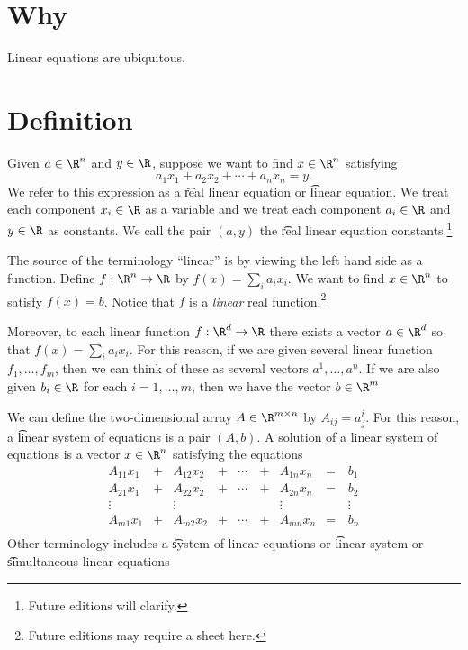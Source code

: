 
\section*{Why}

Linear equations are ubiquitous.

\section*{Definition}

Given $a \in \R ^n$ and $y \in \R $, suppose we want to find $x \in \R ^n$ satisfying
\[
a_1x_1 + a_2x_2 + \cdots + a_nx_n = y.
\]
We refer to this expression as a \t{real linear equation} or \t{linear equation}.
We treat each component $x_i \in \R $ as a variable and we treat each component $a_i \in \R $ and $y \in \R $ as constants.
We call the pair $(a, y)$ the \t{real linear equation constants}.\footnote{Future editions will clarify.}

The source of the terminology ``linear'' is by viewing the left hand side as a function.
Define $f: \R ^n \to \R $ by $f(x) = \sum_{i} a_ix_i$.
We want to find $x \in \R ^n$ to satisfy $f(x) = b$.
Notice that $f$ is a \textit{linear} real function.\footnote{Future editions may require a sheet here.}

Moreover, to each linear function $f: \R ^d \to \R $ there exists a vector $a \in \R ^d$ so that $f(x) = \sum_{i} a_ix_i$.
For this reason, if we are given several linear function $f_1, \dots , f_m$, then we can think of these as several vectors $a^1, \dots , a^n$.
If we are also given $b_i \in \R $ for each $i = 1, \dots , m$, then we have the vector $b \in \R ^m$

We can define the two-dimensional array $A \in \R ^{m \times n}$ by $A_{ij} = a^{i}_j$.
For this reason, a \t{linear system of equations} is a pair $(A, b)$.
A solution of a linear system of equations is a vector $x \in \R ^n$ satisfying the equations
\[
\begin{aligned}
A_{11}x_1 & + & A_{12}x_2 & + & \cdots \, & + & A_{1n}x_n & = \, & b_1 \\
A_{21}x_1 & + & A_{22}x_2 & + & \cdots & + & A_{2n}x_n & = & b_2 \\
\vdots & & \vdots & & & & \vdots & & \vdots \\
A_{m1}x_1 & + & A_{m2}x_2 & + & \cdots & + & A_{mn}x_n & = & b_n \\
\end{aligned}
\]
Other terminology includes a \t{system of linear equations} or \t{linear system} or \t{simultaneous linear equations}

\blankpage